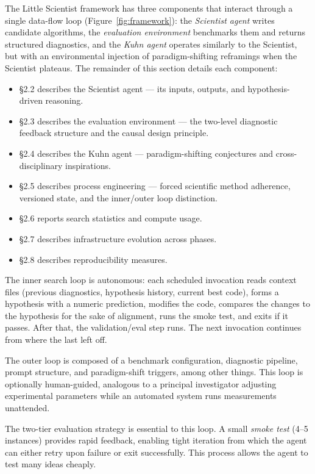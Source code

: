 \documentclass[11pt,a4paper]{article}
\begin{document}
The Little Scientist framework has three components that interact through a single data-flow loop (Figure~\ref{fig:framework}): the \emph{Scientist agent} writes candidate algorithms, the \emph{evaluation environment} benchmarks them and returns structured diagnostics, and the \emph{Kuhn agent} operates similarly to the Scientist, but with an environmental injection of paradigm-shifting reframings when the Scientist plateaus. The remainder of this section details each component:

\begin{itemize}
    \item \S2.2 describes the Scientist agent --- its inputs, outputs, and hypothesis-driven reasoning.
    \item \S2.3 describes the evaluation environment --- the two-level diagnostic feedback structure and the causal design principle.
    \item \S2.4 describes the Kuhn agent --- paradigm-shifting conjectures and cross-disciplinary inspirations.
    \item \S2.5 describes process engineering --- forced scientific method adherence, versioned state, and the inner/outer loop distinction.
    \item \S2.6 reports search statistics and compute usage.
    \item \S2.7 describes infrastructure evolution across phases.
    \item \S2.8 describes reproducibility measures.
\end{itemize}

The inner search loop is autonomous: each scheduled invocation reads context files (previous diagnostics, hypothesis history, current best code), forms a hypothesis with a numeric prediction, modifies the code, compares the changes to the hypothesis for the sake of alignment, runs the smoke test, and exits if it passes. After that, the validation/eval step runs.  The next invocation continues from where the last left off. 

The outer loop is composed of a benchmark configuration, diagnostic pipeline, prompt structure, and paradigm-shift triggers, among other things. This loop is optionally human-guided, analogous to a principal investigator adjusting experimental parameters while an automated system runs measurements unattended.

The two-tier evaluation strategy is essential to this loop. A small \emph{smoke test} (4--5 instances) provides rapid feedback, enabling tight iteration from which the agent can either retry upon failure or exit successfully. This process allows the agent to test many ideas cheaply.
\end{document}
